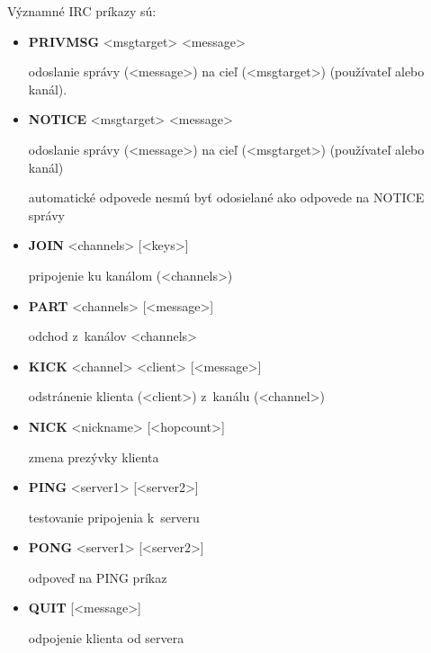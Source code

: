 Významné IRC príkazy sú:
\begin{itemize}
	\item \textbf{PRIVMSG} <msgtarget> <message>
	\begin{framed}
		odoslanie správy (<message>) na cieľ (<msgtarget>) (používateľ alebo kanál).
	\end{framed}

	\item \textbf{NOTICE} <msgtarget> <message>
	\begin{framed}
		odoslanie správy (<message>) na cieľ (<msgtarget>) (používateľ alebo kanál)
		
		automatické odpovede nesmú byť odosielané ako odpovede na NOTICE správy
	\end{framed}

	\item \textbf{JOIN} <channels> [<keys>]
	\begin{framed} 
		pripojenie ku kanálom (<channels>)
	\end{framed}
	
	\item \textbf{PART} <channels> [<message>] 
	\begin{framed} 
		odchod z~kanálov <channels>
	\end{framed}
	
	\item \textbf{KICK} <channel> <client> [<message>]
	\begin{framed} 
		odstránenie klienta (<client>) z~kanálu (<channel>)
	\end{framed}

	\item \textbf{NICK} <nickname> [<hopcount>]
	\begin{framed} 
		zmena prezývky klienta
	\end{framed}

\newpage
	
	\item \textbf{PING} <server1> [<server2>] 
	\begin{framed} 
		testovanie pripojenia k~serveru
	\end{framed}
	
	\item \textbf{PONG} <server1> [<server2>] 
	\begin{framed} 
		odpoveď na PING príkaz
	\end{framed}
	
	\item \textbf{QUIT} [<message>] 
	\begin{framed} 
		odpojenie klienta od servera
	\end{framed}
\end{itemize}

